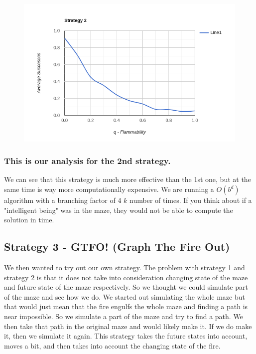 \documentclass[11pt]{scrartcl} %
\begin{document}
\begin{figure}[H]
 	\centering
  	\includegraphics*[scale=0.8]{strategy2.png}
	\label{fig:example}
 \end{figure}

\subsubsection{This is our analysis for the 2nd strategy.}
We can see that this strategy is much more effective than the 1st one, but at the same time is way more computationally expensive. We are running a $O(b^d)$ algorithm with a branching factor of 4 $k$ number of times. If you think about if a "intelligent being" was in the maze, they would not be able to compute the solution in time. 

\subsection{Strategy 3 - GTFO! (Graph The Fire Out)}
We then wanted to try out our own strategy. The problem with strategy 1 and strategy 2 is that it does not take into consideration changing state of the maze and future state of the maze respectively. So we thought we could simulate part of the maze and see how we do. We started out simulating the whole maze but that would just mean that the fire engulfs the whole maze and finding a path is near impossible. So we simulate a part of the maze and try to find a path. We then take that path in the original maze and would likely make it. If we do make it, then we simulate it again. This strategy takes the future states into account, moves a bit, and then takes into account the changing state of the fire. \vspace{2em}\\
\end{document}
